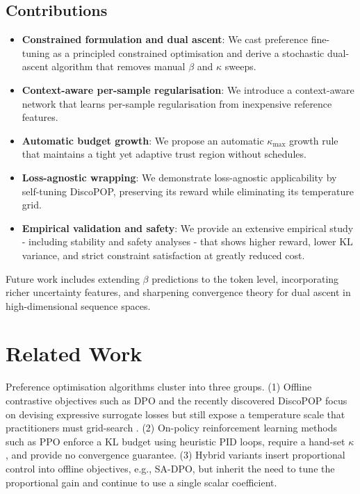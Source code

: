 \documentclass{article}
\begin{document}
\subsection{Contributions}
\begin{itemize}
  \item \textbf{Constrained formulation and dual ascent}: We cast preference fine-tuning as a principled constrained optimisation and derive a stochastic dual-ascent algorithm that removes manual \(\beta\) and \(\kappa\) sweeps.
  \item \textbf{Context-aware per-sample regularisation}: We introduce a context-aware network that learns per-sample regularisation from inexpensive reference features.
  \item \textbf{Automatic budget growth}: We propose an automatic \(\kappa_{\max}\) growth rule that maintains a tight yet adaptive trust region without schedules.
  \item \textbf{Loss-agnostic wrapping}: We demonstrate loss-agnostic applicability by self-tuning DiscoPOP, preserving its reward while eliminating its temperature grid.
  \item \textbf{Empirical validation and safety}: We provide an extensive empirical study - including stability and safety analyses - that shows higher reward, lower KL variance, and strict constraint satisfaction at greatly reduced cost.
\end{itemize}

Future work includes extending \(\beta\) predictions to the token level, incorporating richer uncertainty features, and sharpening convergence theory for dual ascent in high-dimensional sequence spaces.

\section{Related Work}
Preference optimisation algorithms cluster into three groups. (1) Offline contrastive objectives such as DPO and the recently discovered DiscoPOP focus on devising expressive surrogate losses but still expose a temperature scale that practitioners must grid-search \cite{lu-2024-discovering}. (2) On-policy reinforcement learning methods such as PPO enforce a KL budget using heuristic PID loops, require a hand-set \(\kappa\), and provide no convergence guarantee. (3) Hybrid variants insert proportional control into offline objectives, e.g., SA-DPO, but inherit the need to tune the proportional gain and continue to use a single scalar coefficient.
\end{document}
